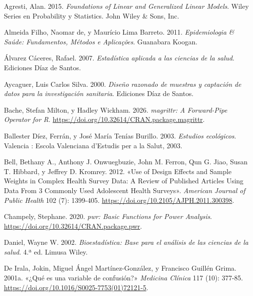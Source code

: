 \documentclass[
  spanish,
  a4paper,
]{scrbook}
\newlength{\cslhangindent}
\newenvironment{CSLReferences}[2] %
 {\begin{list}{}{%
  \setlength{\itemindent}{0pt}
  \setlength{\leftmargin}{0pt}
  \setlength{\parsep}{0pt}
  \ifodd #1
   \setlength{\leftmargin}{\cslhangindent}
   \setlength{\itemindent}{-1\cslhangindent}
  \fi
  \setlength{\itemsep}{#2\baselineskip}}}
 {\end{list}}
\begin{document}
\protect{}\label{refs}
\begin{CSLReferences}{1}{1}
Agresti, Alan. 2015. \emph{Foundations of {Linear} and {Generalized}
{Linear} {Models}}. Wiley {Series} en {Probability} y {Statistics}. John
Wiley \& Sons, Inc.

Almeida Filho, Naomar de, y Maurício Lima Barreto. 2011.
\emph{Epidemiologia \& Saúde: Fundamentos, Métodos e Aplicações}.
Guanabara Koogan.

Álvarez Cáceres, Rafael. 2007. \emph{Estadística aplicada a las ciencias
de la salud}. Ediciones Díaz de Santos.

Aycaguer, Luis Carlos Silva. 2000. \emph{Diseño razonado de muestras y
captación de datos para la investigación sanitaria}. Ediciones Díaz de
Santos.

Bache, Stefan Milton, y Hadley Wickham. 2026. \emph{magrittr: A
Forward-Pipe Operator for R}.
\url{https://doi.org/10.32614/CRAN.package.magrittr}.

Ballester Díez, Ferrán, y José María Tenías Burillo. 2003.
\emph{Estudios ecológicos}. Valencia : Escola Valenciana d'Estudis per a
la Salut, 2003.

Bell, Bethany A., Anthony J. Onwuegbuzie, John M. Ferron, Qun G. Jiao,
Susan T. Hibbard, y Jeffrey D. Kromrey. 2012. {«Use of {Design}
{Effects} and {Sample} {Weights} in {Complex} {Health} {Survey} {Data}:
{A} {Review} of {Published} {Articles} {Using} {Data} {From} 3
{Commonly} {Used} {Adolescent} {Health} {Surveys}»}. \emph{American
Journal of Public Health} 102 (7): 1399-405.
\url{https://doi.org/10.2105/AJPH.2011.300398}.

Champely, Stephane. 2020. \emph{pwr: Basic Functions for Power
Analysis}. \url{https://doi.org/10.32614/CRAN.package.pwr}.

Daniel, Wayne W. 2002. \emph{Bioestadística: {Base} para el análisis de
las ciencias de la salud}. 4.ª ed. Limusa Wiley.

De Irala, Jokin, Miguel Ángel Martínez-González, y Francisco Guillén
Grima. 2001a. {«¿{Qué} es una variable de confusión?»} \emph{Medicina
Clínica} 117 (10): 377-85.
\url{https://doi.org/10.1016/S0025-7753(01)72121-5}.


\end{CSLReferences}
\end{document}
